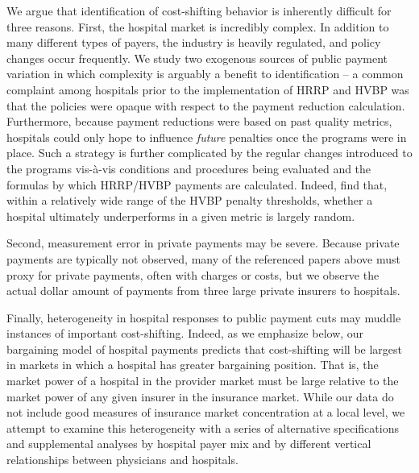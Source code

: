 \documentclass[12pt]{article}
\begin{document}
We argue that identification of cost-shifting behavior is inherently difficult for three reasons.  First, the hospital market is incredibly complex.  In addition to many different types of payers, the industry is heavily regulated, and policy changes occur frequently.  We study two exogenous sources of public payment variation in which complexity is arguably a benefit to identification -- a common complaint among hospitals prior to the implementation of HRRP and HVBP was that the policies were opaque with respect to the payment reduction calculation.  Furthermore, because payment reductions were based on past quality metrics, hospitals could only hope to influence \textit{future} penalties once the programs were in place. Such a strategy is further complicated by the regular changes introduced to the programs vis-\`a-vis conditions and procedures being evaluated and the formulas by which HRRP/HVBP payments are calculated. Indeed, \cite{friedson2016} find that, within a relatively wide range of the HVBP penalty thresholds, whether a hospital ultimately underperforms in a given metric is largely random.

Second, measurement error in private payments may be severe.  Because private payments are typically not observed, many of the referenced papers above must proxy for private payments, often with charges or costs, but we observe the actual dollar amount of payments from three large private insurers to hospitals.

Finally, heterogeneity in hospital responses to public payment cuts may muddle instances of important cost-shifting.  Indeed, as we emphasize below, our bargaining model of hospital payments predicts that cost-shifting will be largest in markets in which a hospital has greater bargaining position.  That is, the market power of a hospital in the provider market must be large relative to the market power of any given insurer in the insurance market.  While our data do not include good measures of insurance market concentration at a local level, we attempt to examine this heterogeneity with a series of alternative specifications and supplemental analyses by hospital payer mix and by different vertical relationships between physicians and hospitals.
\end{document}
